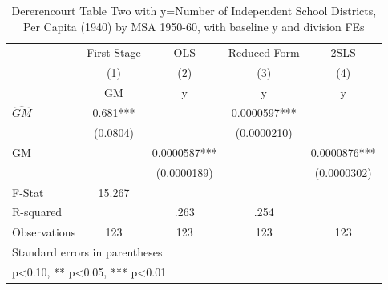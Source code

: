 \begin{table}[htbp]\centering
\def\sym#1{\ifmmode^{#1}\else\(^{#1}\)\fi}
\caption{Dererencourt Table Two with y=Number of Independent School Districts, Per Capita (1940) by MSA 1950-60, with baseline y and division FEs}
\begin{tabular}{l*{4}{c}}
\toprule
                    & First Stage   &         OLS   &Reduced Form   &        2SLS   \\
                    &\multicolumn{1}{c}{(1)}&\multicolumn{1}{c}{(2)}&\multicolumn{1}{c}{(3)}&\multicolumn{1}{c}{(4)}\\
                    &\multicolumn{1}{c}{GM}&\multicolumn{1}{c}{y}&\multicolumn{1}{c}{y}&\multicolumn{1}{c}{y}\\
\midrule
$\hat{GM}$          &       0.681***&               &   0.0000597***&               \\
                    &    (0.0804)   &               & (0.0000210)   &               \\
\addlinespace
GM                  &               &   0.0000587***&               &   0.0000876***\\
                    &               & (0.0000189)   &               & (0.0000302)   \\
\midrule
F-Stat              &      15.267   &               &               &               \\
R-squared           &               &        .263   &        .254   &               \\
Observations        &         123   &         123   &         123   &         123   \\
\bottomrule
\multicolumn{5}{l}{\footnotesize Standard errors in parentheses}\\
\multicolumn{5}{l}{\footnotesize * p<0.10, ** p<0.05, *** p<0.01}\\
\end{tabular}
\end{table}

